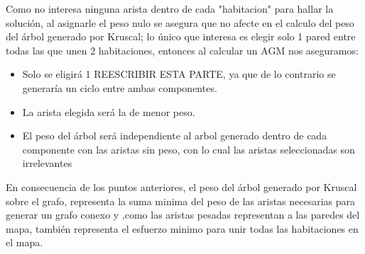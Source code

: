 Como no interesa ninguna arista dentro de cada "habitacion" para hallar la solución, al asignarle el peso nulo se asegura que no afecte en el calculo del peso del árbol generado por Kruscal; lo único que interesa es elegir solo 1 pared entre todas las que unen 2 habitaciones, entonces al calcular un AGM nos aseguramos:
\begin{itemize}
\item Solo se eligirá 1 REESCRIBIR ESTA PARTE, ya que de lo contrario se generaría un ciclo entre ambas componentes.
\item La arista elegida será la de menor peso.
\item El peso del árbol será independiente al arbol generado dentro de cada componente con las aristas sin peso, con lo cual las aristas seleccionadas son irrelevantes
\end{itemize}

En consecuencia de los puntos anteriores, el peso del árbol generado por Kruscal sobre el grafo, representa la suma minima del peso de las aristas necesarias para generar un grafo conexo y ,como las aristas pesadas representan a las paredes del mapa, también representa el esfuerzo minimo para unir todas las habitaciones en el mapa. 


